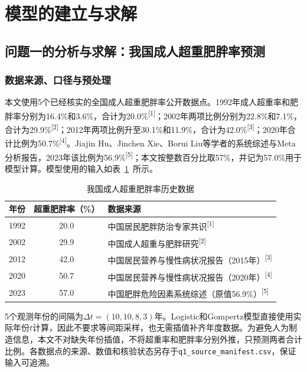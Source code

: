 \section{模型的建立与求解}

\subsection{问题一的分析与求解：我国成人超重肥胖率预测}

\subsubsection{数据来源、口径与预处理}

本文使用5个已经核实的全国成人超重肥胖率公开数据点。1992年成人超重率和肥胖率分别为16.4\%和3.6\%，合计为20.0\%\textsuperscript{[1]}；2002年两项比例分别为22.8\%和7.1\%，合计为29.9\%\textsuperscript{[2]}；2012年两项比例升至30.1\%和11.9\%，合计为42.0\%\textsuperscript{[3]}；2020年合计比例为50.7\%\textsuperscript{[4]}。Jiajin Hu、Jinchen Xie、Borui Liu等学者的系统综述与Meta分析报告，2023年该比例为56.9\%\textsuperscript{[5]}；本文按整数百分比取57\%，并记为57.0\%用于模型计算。模型使用的输入如表~\ref{tab:q1-data}~所示。

\begin{table}[H]
\centering
\caption{我国成人超重肥胖率历史数据}
\label{tab:q1-data}
\begin{tabular}{ccp{7.0cm}}
\toprule
年份 & 超重肥胖率（\%） & 数据来源 \\
\midrule
1992 & 20.0 & 中国居民肥胖防治专家共识\textsuperscript{[1]} \\
2002 & 29.9 & 中国成人超重与肥胖研究\textsuperscript{[2]} \\
2012 & 42.0 & 中国居民营养与慢性病状况报告（2015年）\textsuperscript{[3]} \\
2020 & 50.7 & 中国居民营养与慢性病状况报告（2020年）\textsuperscript{[4]} \\
2023 & 57.0 & 中国肥胖危险因素系统综述（原值56.9\%）\textsuperscript{[5]} \\
\bottomrule
\end{tabular}
\end{table}

5个观测年份的间隔为$\Delta t=(10,10,8,3)$年。Logistic和Gompertz模型直接使用实际年份$t$计算，因此不要求等间距采样，也无需插值补齐年度数据。为避免人为制造信息，本文不对缺失年份插值，不将超重率和肥胖率分别外推，只预测两者合计比例。各数据点的来源、数值和核验状态另存于\texttt{q1\_source\_manifest.csv}，保证输入可追溯。

